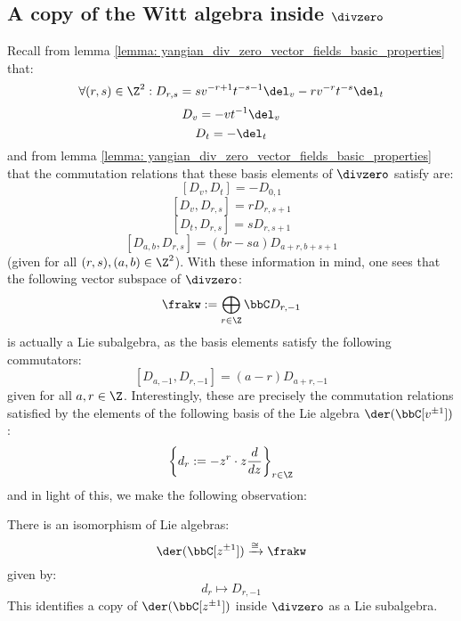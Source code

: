     \subsection{A copy of the Witt algebra inside \texorpdfstring{$\divzero$}{}}
        Recall from lemma \ref{lemma: yangian_div_zero_vector_fields_basic_properties} that:
            $$\forall (r, s) \in \Z^2: D_{r, s} = s v^{-r + 1} t^{-s - 1} \del_v - r v^{-r} t^{-s} \del_t$$
            $$D_v = -v t^{-1} \del_v$$
            $$D_t = -\del_t$$
        and from lemma \ref{lemma: yangian_div_zero_vector_fields_basic_properties} that the commutation relations that these basis elements of $\divzero$ satisfy are:
            $$[D_v, D_t] = -D_{0, 1}$$
            $$[D_v, D_{r, s}] = r D_{r, s + 1}$$
            $$[D_t, D_{r, s}] = s D_{r, s + 1}$$
            $$[D_{a, b}, D_{r, s}] = (br - sa) D_{a + r, b + s + 1}$$
        (given for all $(r, s), (a, b) \in \Z^2$). With these information in mind, one sees that the following vector subspace of $\divzero$:
            $$\frakw := \bigoplus_{r \in \Z} \bbC D_{r, -1}$$
        is actually a Lie subalgebra, as the basis elements satisfy the following commutators:
            $$[D_{a, -1}, D_{r, -1}] = (a - r) D_{a + r, -1}$$
        given for all $a, r \in \Z$. Interestingly, these are precisely the commutation relations satisfied by the elements of the following basis of the Lie algebra $\der(\bbC[v^{\pm 1}])$:
            $$\left\{ d_r := -z^r \cdot z \frac{d}{dz} \right\}_{r \in \Z}$$
        and in light of this, we make the following observation:
        \begin{proposition} \label{prop: a_copy_of_the_witt_algebra_inside_the_lie_algebra_of_yangian_div_zero_vector_fields}
            There is an isomorphism of Lie algebras:
                $$\der(\bbC[z^{\pm 1}]) \xrightarrow[]{\cong} \frakw$$
            given by:
                $$d_r \mapsto D_{r, -1}$$
            This identifies a copy of $\der(\bbC[z^{\pm 1}])$ inside $\divzero$ as a Lie subalgebra. 
        \end{proposition}